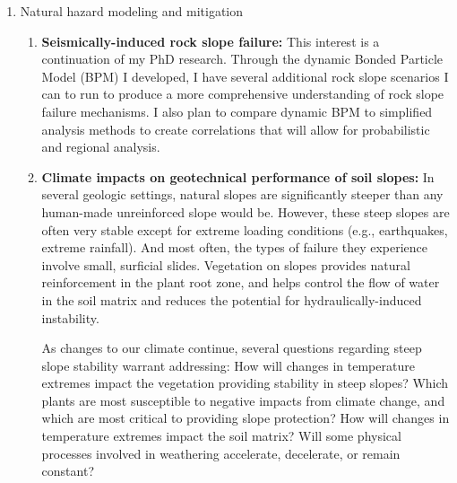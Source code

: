 \documentclass[10pt,letterpaper]{article}
\begin{document}
\begin{enumerate}
\item Natural hazard modeling and mitigation
\begin{enumerate}
\item \textbf{Seismically-induced rock slope failure:} This interest is a continuation of my PhD research.
Through the dynamic Bonded Particle Model (BPM) I developed, I have several additional rock slope scenarios I can to run to produce a more comprehensive understanding of rock slope failure mechanisms.
I also plan to compare dynamic BPM to simplified analysis methods to create correlations that will allow for probabilistic and regional analysis.
\item \textbf{Climate impacts on geotechnical performance of soil slopes:} In several geologic settings, natural slopes are significantly steeper than any human-made unreinforced slope would be. 
However, these steep slopes are often very stable except for extreme loading conditions (e.g., earthquakes, extreme rainfall).
And most often, the types of failure they experience involve small, surficial slides.
Vegetation on slopes provides natural reinforcement in the plant root zone, and helps control the flow of water in the soil matrix and reduces the potential for hydraulically-induced instability.

As changes to our climate continue, several questions regarding steep slope stability warrant addressing:
How will changes in temperature extremes impact the vegetation providing stability in steep slopes? Which plants are most susceptible to negative impacts from climate change, and which are most critical to providing slope protection?
How will changes in temperature extremes impact the soil matrix? Will some physical processes involved in weathering accelerate, decelerate, or remain constant?


\end{enumerate}
\end{enumerate}
\end{document}

